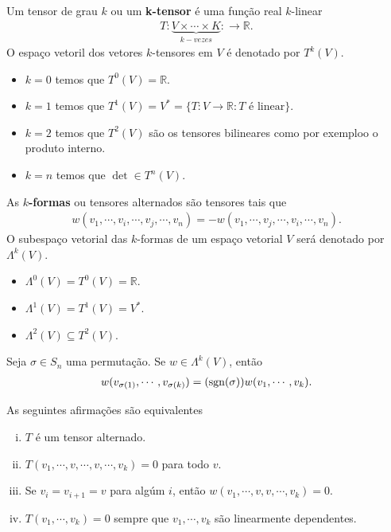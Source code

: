 \begin{definition}[$k$-tensor]
  Um tensor de grau $k$ ou um  \textbf{k-tensor} é uma função real $k$-linear
  \begin{align*}
    T:\underbrace{V\times\cdots\times K}_{k-vezes}:\to \mathbb{R}.
  \end{align*}
  O espaço vetoril dos vetores $k$-tensores em $V$ é denotado por $T^{k}(V)$. 
\end{definition}
\begin{example}
  \phantom{X}
  \begin{itemize}
    \item $k=0$ temos que $T^{0}(V)=\mathbb{R}$.
    \item $k=1$ temos que $T^{1}(V)=V^{\ast}=\{T:V\to\mathbb{R}: T\text{ é linear}\}$.
    \item $k=2$ temos que $T^{2}(V)$ são os tensores bilineares como por exemploo o produto interno.
    \item $k=n$ temos que $\det\in T^{n}(V)$. 
  \end{itemize}
\end{example}
\begin{definition}[$k$-formas]
  As \textbf{$k$-formas} ou tensores alternados são tensores tais que
  \begin{align*}
    w(v_1,\cdots,v_i,\cdots,v_j,\cdots,v_n)=-w(v_1,\cdots,v_j,\cdots,v_i,\cdots,v_n).
  \end{align*}
  O subespaço vetorial das $k$-formas de um espaço vetorial $V$ será denotado por $\Lambda^{k}(V)$. 
\end{definition}
\begin{example}
  \phantom{X}
  \begin{itemize}
    \item $\Lambda^{0}(V)=T^{0}(V)=\mathbb{R}$.
    \item $\Lambda^{1}(V)=T^{1}(V)=V^{\ast}$.
    \item $\Lambda^{2}(V)\subseteq T^{2}(V)$.
  \end{itemize}
\end{example}
\begin{proposition}
  Seja $\sigma\in S_n$ uma permutação. Se $w\in\Lambda^{k}(V)$, então
  \begin{align*}
    w(v_{\sigma(1)},\cdots,v_{\sigma(k)})=(\operatorname{sgn}(\sigma))w(v_1,\cdots,v_k).
  \end{align*}
\end{proposition}
\begin{proposition}
  As seguintes afirmações são equivalentes
  \begin{enumerate}[i)]
    \item $T$ é um tensor alternado.
    \item $T(v_1,\cdots,v,\cdots,v,\cdots,v_k)=0$ para todo $v$.
    \item Se $v_i=v_{i+1}=v$ para algúm $i$, então $w(v_1,\cdots,v,v,\cdots,v_k)=0$.
    \item $T(v_1,\cdots,v_k)=0$ sempre que $v_1,\cdots,v_k$ são linearmente dependentes. 
  \end{enumerate}
\end{proposition}
